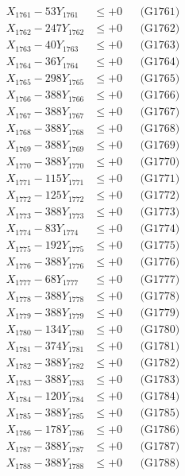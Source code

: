 \documentclass[a4paper,10pt]{article}
\begin{document}
{\begin{align}
\allowbreak
X_{1761} - 53Y_{1761} &\leq +0 && \text{(G1761)} \\
X_{1762} - 247Y_{1762} &\leq +0 && \text{(G1762)} \\
X_{1763} - 40Y_{1763} &\leq +0 && \text{(G1763)} \\
X_{1764} - 36Y_{1764} &\leq +0 && \text{(G1764)} \\
X_{1765} - 298Y_{1765} &\leq +0 && \text{(G1765)} \\
X_{1766} - 388Y_{1766} &\leq +0 && \text{(G1766)} \\
X_{1767} - 388Y_{1767} &\leq +0 && \text{(G1767)} \\
X_{1768} - 388Y_{1768} &\leq +0 && \text{(G1768)} \\
X_{1769} - 388Y_{1769} &\leq +0 && \text{(G1769)} \\
X_{1770} - 388Y_{1770} &\leq +0 && \text{(G1770)} \\
\allowbreak
X_{1771} - 115Y_{1771} &\leq +0 && \text{(G1771)} \\
X_{1772} - 125Y_{1772} &\leq +0 && \text{(G1772)} \\
X_{1773} - 388Y_{1773} &\leq +0 && \text{(G1773)} \\
X_{1774} - 83Y_{1774} &\leq +0 && \text{(G1774)} \\
X_{1775} - 192Y_{1775} &\leq +0 && \text{(G1775)} \\
X_{1776} - 388Y_{1776} &\leq +0 && \text{(G1776)} \\
X_{1777} - 68Y_{1777} &\leq +0 && \text{(G1777)} \\
X_{1778} - 388Y_{1778} &\leq +0 && \text{(G1778)} \\
X_{1779} - 388Y_{1779} &\leq +0 && \text{(G1779)} \\
X_{1780} - 134Y_{1780} &\leq +0 && \text{(G1780)} \\
\allowbreak
X_{1781} - 374Y_{1781} &\leq +0 && \text{(G1781)} \\
X_{1782} - 388Y_{1782} &\leq +0 && \text{(G1782)} \\
X_{1783} - 388Y_{1783} &\leq +0 && \text{(G1783)} \\
X_{1784} - 120Y_{1784} &\leq +0 && \text{(G1784)} \\
X_{1785} - 388Y_{1785} &\leq +0 && \text{(G1785)} \\
X_{1786} - 178Y_{1786} &\leq +0 && \text{(G1786)} \\
X_{1787} - 388Y_{1787} &\leq +0 && \text{(G1787)} \\
X_{1788} - 388Y_{1788} &\leq +0 && \text{(G1788)} \\

\end{align}}
\end{document}
